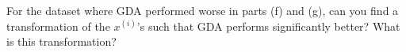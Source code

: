 \clearpage
\item {} For the dataset where GDA performed worse in
parts (f) and (g), can you find a transformation of the $x^{(i)}$'s such
that GDA performs significantly better? What is this transformation?

\ifnum{}\fi
